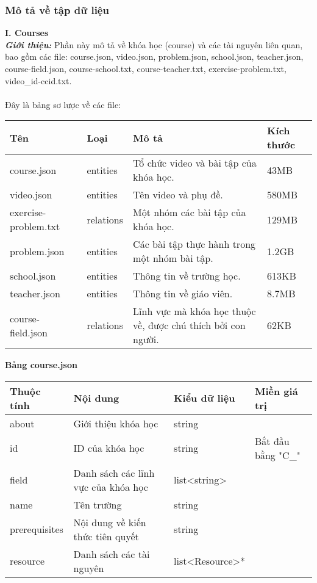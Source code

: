\subsubsection{Mô tả về tập dữ liệu}
\textbf{I. Courses}\\
\textbf{\textit{Giới thiệu:}} Phần này mô tả về khóa học (course) và các tài nguyên liên quan, bao gồm các file: course.json, video.json, problem.json, school.json, teacher.json, course-field.json, course-school.txt, course-teacher.txt, exercise-problem.txt, video\_id-ccid.txt.\\
\\
Đây là bảng sơ lược về các file:
\begin{center}
\begin{tabular}{|| m{5em}  m{5em}  m{18em}  m{5em}||} 
 \hline
 Tên & Loại & Mô tả & Kích thước \\ [0.5ex] 
 \hline\hline
 course.json & entities & Tổ chức video và bài tập của khóa học. & 43MB \\ 
 \hline
 video.json & entities & Tên video và phụ đề. & 580MB \\
 \hline
 exercise-problem.txt & relations & Một nhóm các bài tập của khóa học. & 129MB \\
 \hline
 problem.json & entities & Các bài tập thực hành trong một nhóm bài tập. & 1.2GB \\
 \hline
 school.json & entities & Thông tin về trường học. & 613KB \\
 \hline
 teacher.json & entities & Thông tin về giáo viên. & 8.7MB \\
 \hline
 course-field.json & relations & Lĩnh vực mà khóa học thuộc về, được chú thích bởi con người. & 62KB \\ [1ex] 
 \hline
\end{tabular}
\end{center}
\newpage
\textbf{Bảng course.json}
\begin{center}
\begin{tabular}{|| m{5em}  m{10em}  m{8em}  m{8em}||} 
 \hline
 Thuộc tính & Nội dung & Kiểu dữ liệu & Miền giá trị \\ [0.5ex] 
 \hline\hline
 about & Giới thiệu khóa học & string &  \\ 
 \hline
 id & ID của khóa học & string & Bắt đầu bằng "C\_" \\
 \hline
 field & Danh sách các lĩnh vực của khóa học & list<string> &  \\
 \hline
 name & Tên trường & string &  \\
 \hline
 prerequisites & Nội dung về kiến thức tiên quyết & string &  \\
 \hline
 resource & Danh sách các tài nguyên & list<Resource>* &  \\ [1ex] 
 \hline
\end{tabular}
\end{center}
